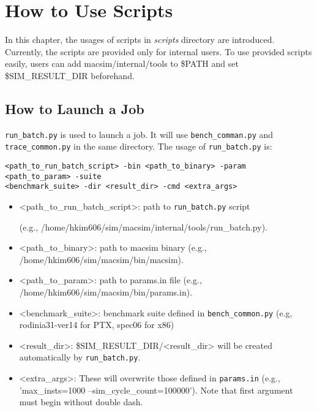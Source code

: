 \chapter{How to Use Scripts}
\label{sec:use_scripts}
In this chapter, the usages of scripts in \textit{scripts} directory are introduced.
Currently, the scripts are provided only for internal users.
To use provided scripts easily, users can add macsim/internal/tools to \$PATH
and set \$SIM\_RESULT\_DIR beforehand.


\section{How to Launch a Job}

\Verb+run_batch.py+ is used to launch a job. It will use
\Verb+bench_comman.py+ and \Verb+trace_common.py+ in the same directory. 
The usage of \Verb+run_batch.py+ is:

\begin{Verbatim}
<path_to_run_batch_script> -bin <path_to_binary> -param <path_to_param> -suite
<benchmark_suite> -dir <result_dir> -cmd <extra_args>
\end{Verbatim}

\begin{itemize}
  \item <path\_to\_run\_batch\_script>: path to \Verb+run_batch.py+ script

        (e.g., /home/hkim606/sim/macsim/internal/tools/run\_batch.py).
  \item <path\_to\_binary>: path to macsim binary (e.g., /home/hkim606/sim/macsim/bin/macsim).
  \item <path\_to\_param>: path to params.in file (e.g., /home/hkim606/sim/macsim/bin/params.in).
  \item <benchmark\_suite>: benchmark suite defined in \Verb+bench_common.py+
        (e.g, rodinia31-ver14 for PTX, spec06 for x86)
  \item <result\_dir>: \$SIM\_RESULT\_DIR/<result\_dir> will be created automatically by \Verb+run_batch.py+.
  \item <extra\_args>: These will overwrite those defined in \Verb+params.in+ (e.g., 'max\_insts=1000 --sim\_cycle\_count=100000').
        Note that first argument must begin without double dash.
\end{itemize}

